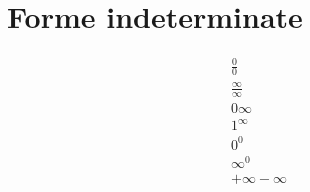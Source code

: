 \section{Forme indeterminate}
\begin{gather*}
\frac{0}{0} \\
\frac{\infty}{\infty} \\
0\infty \\
1^\infty \\
0^0 \\
\infty^0 \\
+\infty-\infty
\end{gather*}
